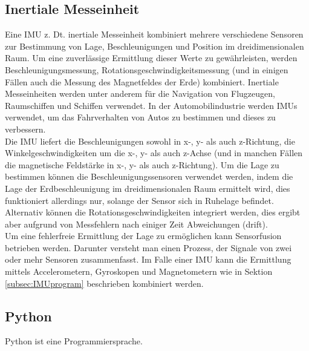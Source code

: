 \subsection{Inertiale Messeinheit}
\label{subsec:tIMU}
Eine \ac{IMU} z. Dt. inertiale Messeinheit kombiniert mehrere verschiedene Sensoren zur Bestimmung von Lage, Beschleunigungen und Position im dreidimensionalen Raum. Um eine zuverlässige Ermittlung dieser Werte zu gewährleisten, werden Beschleunigungsmessung, Rotationsgeschwindigkeitsmessung (und in einigen Fällen auch die Messung des Magnetfeldes der Erde) kombiniert. Inertiale Messeinheiten werden unter anderem für die Navigation von Flugzeugen, Raumschiffen und Schiffen verwendet. In der Automobilindustrie werden \ac{IMU}s verwendet, um das Fahrverhalten von Autos zu bestimmen und dieses zu verbessern.\\
Die \ac{IMU} liefert die Beschleunigungen sowohl in x-, y- als auch z-Richtung, die Winkelgeschwindigkeiten um die x-, y- als auch z-Achse (und in manchen Fällen die magnetische Feldstärke in x-, y- als auch z-Richtung). Um die Lage zu bestimmen können die Beschleunigungssensoren verwendet werden, indem die Lage der Erdbeschleunigung im dreidimensionalen Raum ermittelt wird, dies funktioniert allerdings nur, solange der Sensor sich in Ruhelage befindet. Alternativ können die Rotationsgeschwindigkeiten integriert werden, dies ergibt aber aufgrund von Messfehlern nach einiger Zeit Abweichungen (drift).\\ Um eine fehlerfreie Ermittlung der Lage zu ermöglichen kann Sensorfusion betrieben werden. Darunter versteht man einen Prozess, der Signale von zwei oder mehr Sensoren zusammenfasst. Im Falle einer \ac{IMU} kann die Ermittlung mittels Accelerometern, Gyroskopen und Magnetometern wie in Sektion \ref{subsec:IMUprogram} beschrieben kombiniert werden.
\cite{UCAM-CL-TR-696}

\subsection{Python}
\label{subsec:tPython}
Python ist eine Programmiersprache.
